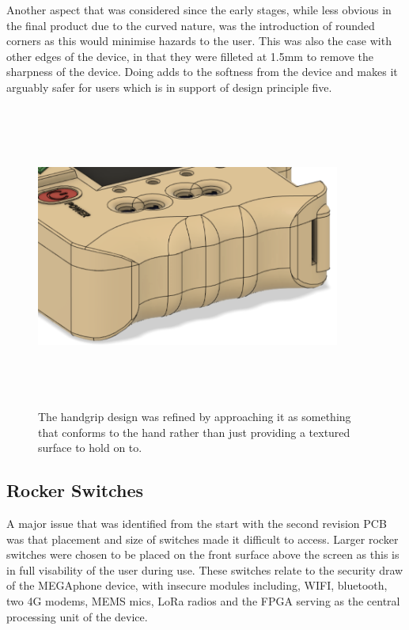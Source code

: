 Another aspect that was considered since the early stages, while less obvious in the final product due to the curved nature, was the introduction of rounded corners as this would minimise hazards to the user.
This was also the case with other edges of the device, in that they were filleted at 1.5mm to remove the sharpness of the device.
Doing adds to the softness from the device and makes it arguably safer for users which is in support of design principle five.

\begin{figure} [h]
    \centering
    \includegraphics[width=10cm,height=10cm,keepaspectratio]{Figures/handgrip_final.png}
    \caption{The handgrip design was refined by approaching it as something that conforms to the hand rather than just providing a textured surface to hold on to.}
    \label{fig:Design_3}
\end{figure}

\subsection{Rocker Switches}

A major issue that was identified from the start with the second revision PCB was that placement and size of switches made it difficult to access.
Larger rocker switches were chosen to be placed on the front surface above the screen as this is in full visability of the user during use.
These switches relate to the security draw of the MEGAphone device, with insecure modules including, WIFI, bluetooth, two 4G modems, MEMS mics, LoRa radios and the FPGA serving as the central processing unit of the device.

